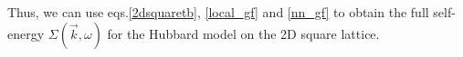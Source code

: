 \documentclass{article}
\numberwithin{equation}{section}
\begin{document}
Thus, we can use eqs.\eqref{2dsquaretb}, \eqref{local_gf} and \eqref{nn_gf} to obtain the full self-energy $\Sigma (\vec{k},\omega)$ for the Hubbard model on the 2D square lattice.
\end{document}
